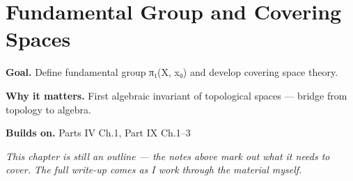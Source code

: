 \chapter{Fundamental Group and Covering Spaces}
\label{ch:09-topology-05}

\begin{chapterintro}
\textbf{Goal.} Define fundamental group π₁(X, x₀) and develop covering space theory.

\textbf{Why it matters.} First algebraic invariant of topological spaces — bridge from topology to algebra.

\textbf{Builds on.} Parts IV Ch.1, Part IX Ch.1–3
\end{chapterintro}

\textit{This chapter is still an outline --- the notes above mark out what it needs to cover. The full write-up comes as I work through the material myself.}
